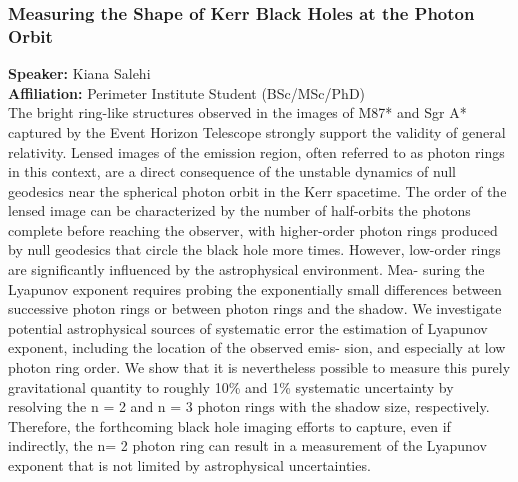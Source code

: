 \subsubsection*{Measuring the Shape of Kerr Black Holes at the Photon Orbit}
\textbf{Speaker:} Kiana Salehi \\
\textbf{Affiliation:} Perimeter Institute \textperiodcentered{} Student (BSc/MSc/PhD)\\
The bright ring-like structures observed in the images of M87* and Sgr A* captured by the Event
Horizon Telescope strongly support the validity of general relativity. Lensed images of the emission
region, often referred to as photon rings in this context, are a direct consequence of the unstable
dynamics of null geodesics near the spherical photon orbit in the Kerr spacetime. The order of the
lensed image can be characterized by the number of half-orbits the photons complete before reaching
the observer, with higher-order photon rings produced by null geodesics that circle the black hole more
times. However, low-order rings are significantly influenced by the astrophysical environment. Mea-
suring the Lyapunov exponent requires probing the exponentially small differences between successive
photon rings or between photon rings and the shadow. We investigate potential astrophysical sources
of systematic error the estimation of Lyapunov exponent, including the location of the observed emis-
sion, and especially at low photon ring order. We show that it is nevertheless possible to measure this
purely gravitational quantity to roughly 10\% and 1\% systematic uncertainty by resolving the n = 2
and n = 3 photon rings with the shadow size, respectively. Therefore, the forthcoming black hole
imaging efforts to capture, even if indirectly, the n= 2 photon ring can result in a measurement of the
Lyapunov exponent that is not limited by astrophysical uncertainties.

\hypertarget{abs-21}{}
